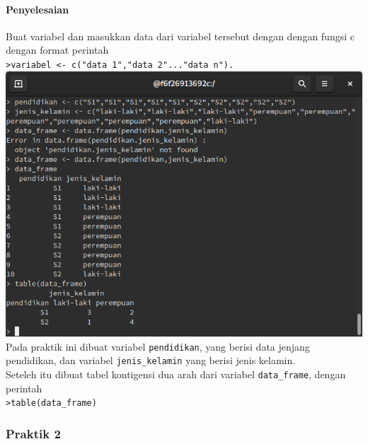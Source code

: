 \documentclass[a4paper,12pt]{article}
\begin{document}
\paragraph{Penyelesaian\\}
Buat variabel dan masukkan data dari variabel tersebut dengan dengan fungsi c dengan format perintah\\ 
\texttt{>variabel <- c("data 1","data 2"..."data n").}\\
\includegraphics[width=\linewidth]{1}\\
Pada praktik ini dibuat variabel \texttt{pendidikan}, yang berisi data jenjang pendidikan, dan variabel \texttt{jenis\_kelamin} yang berisi jenis kelamin.\\
Seteleh itu dibuat tabel kontigensi dua arah dari variabel \texttt{data\_frame}, dengan perintah\\
\texttt{>table(data\_frame)}
\subsubsection{Praktik 2}
\end{document}
